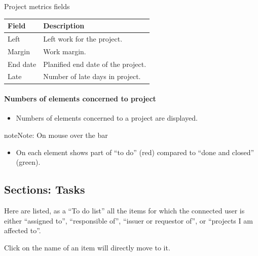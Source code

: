 \documentclass[letterpaper,10pt,english]{sphinxmanual}
\begin{document}
\begin{threeparttable}
\capstart\caption{Project metrics fields}
\label{Today:id6}
\begin{tabulary}{\linewidth}{|l|l|}
\hline
\textsf{\relax 
Field
} & \textsf{\relax 
Description
}\\
\hline
Left
 & 
Left work for the project.
\\
\hline
Margin
 & 
Work margin.
\\
\hline
End date
 & 
Planified end date of the project.
\\
\hline
Late
 & 
Number of late days in project.
\\
\hline\end{tabulary}

\end{threeparttable}

\paragraph{Numbers of elements concerned to project}
\begin{itemize}
\item {} 
Numbers of elements concerned to a project are displayed. 

\end{itemize}

\begin{notice}{note}{Note:}
On mouse over the bar
\begin{itemize}
\item {} 
On each element shows part of “to do” (red) compared to “done and closed” (green).

\end{itemize}
\end{notice}
\newpage

\subsection{Sections: Tasks}
\label{Today:sections-tasks}
Here are listed, as a “To do list” all the items for which the connected user is either “assigned to”, “responsible of”, “issuer or requestor of”, or ``projects I am affected to''.

Click on the name of an item will directly move to it.
\end{document}
